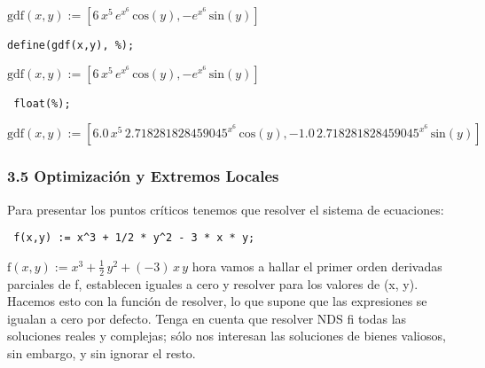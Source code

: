 \documentclass[12pt]{article}
\begin{document}

\begin{math}
\mathrm{gdf}\left( x,y\right) :=[6\,{x}^{5}\,{e}^{{x}^{6}}\,\mathrm{cos}\left( y\right) ,-{e}^{{x}^{6}}\,\mathrm{sin}\left( y\right) ]
\end{math}


\noindent

\begin{verbatim}
define(gdf(x,y), %);
\end{verbatim}


\begin{math}
\mathrm{gdf}\left( x,y\right) :=[6\,{x}^{5}\,{e}^{{x}^{6}}\,\mathrm{cos}\left( y\right) ,-{e}^{{x}^{6}}\,\mathrm{sin}\left( y\right) ]
\end{math}


\noindent

\begin{verbatim}
 float(%);
\end{verbatim}


\begin{math}
\mathrm{gdf}\left( x,y\right) :=[6.0\,{x}^{5}\,{2.718281828459045}^{{x}^{6}}\,\mathrm{cos}\left( y\right) ,-1.0\,{2.718281828459045}^{{x}^{6}}\,\mathrm{sin}\left( y\right) ]
\end{math}


\subsubsection*{3.5 Optimización y Extremos Locales}

Para presentar los puntos críticos  tenemos que resolver el sistema de ecuaciones:


\noindent


\begin{verbatim}
 f(x,y) := x^3 + 1/2 * y^2 - 3 * x * y;
\end{verbatim}

\begin{math}
\mathrm{f}\left( x,y\right) :={x}^{3}+\frac{1}{2}\,{y}^{2}+\left( -3\right) \,x\,y
\end{math}
hora vamos a hallar el primer orden derivadas parciales de f, establecen iguales a cero y resolver para los valores de (x, y). Hacemos esto con la función de resolver, lo que supone que las expresiones se igualan a cero por defecto. Tenga en cuenta que resolver NDS fi todas las soluciones reales y complejas; sólo nos interesan las soluciones de bienes valiosos, sin embargo, y sin ignorar el resto.
\end{document}
